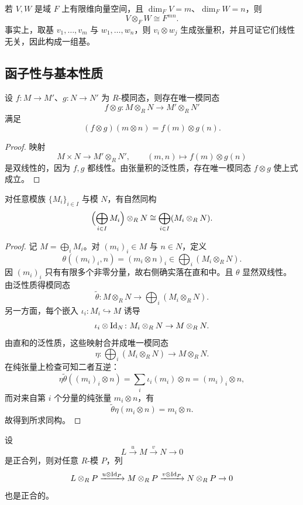 \begin{example}
若 $V,W$ 是域 $F$ 上有限维向量空间，且 $\dim_FV=m$、$\dim_FW=n$，则
\[
V\otimes_F W\cong F^{mn}.
\]
事实上，取基 $v_1,\dots,v_m$ 与 $w_1,\dots,w_n$，则 $v_i\otimes w_j$ 生成张量积，并且可证它们线性无关，因此构成一组基。
\end{example}

\subsection{函子性与基本性质}

\begin{proposition}[函子性]
设 $f\colon M\to M'$、$g\colon N\to N'$ 为 $R$-模同态，则存在唯一模同态
\[
f\otimes g\colon M\otimes_R N\to M'\otimes_R N'
\]
满足
\[
(f\otimes g)(m\otimes n)=f(m)\otimes g(n).
\]
\end{proposition}

\begin{proof}
映射
\[
M\times N\to M'\otimes_R N',
\qquad (m,n)\mapsto f(m)\otimes g(n)
\]
是双线性的，因为 $f,g$ 都线性。由张量积的泛性质，存在唯一模同态 $f\otimes g$ 使上式成立。
\end{proof}

\begin{proposition}
对任意模族 $\{M_i\}_{i\in I}$ 与模 $N$，有自然同构
\[
\Bigl(\bigoplus_{i\in I} M_i\Bigr)\otimes_R N\cong \bigoplus_{i\in I}(M_i\otimes_R N).
\]
\end{proposition}

\begin{proof}
记 $M=\bigoplus_i M_i$。对 $(m_i)_i\in M$ 与 $n\in N$，定义
\[
\theta((m_i)_i,n)=(m_i\otimes n)_i\in \bigoplus_i(M_i\otimes_R N).
\]
因 $(m_i)_i$ 只有有限多个非零分量，故右侧确实落在直和中。且 $\theta$ 显然双线性。由泛性质得模同态
\[
\widetilde\theta\colon M\otimes_R N\to \bigoplus_i(M_i\otimes_R N).
\]
另一方面，每个嵌入 $\iota_i\colon M_i\hookrightarrow M$ 诱导
\[
\iota_i\otimes \mathrm{Id}_N\colon M_i\otimes_R N\to M\otimes_R N.
\]
由直和的泛性质，这些映射合并成唯一模同态
\[
\eta\colon \bigoplus_i(M_i\otimes_R N)\to M\otimes_R N.
\]
在纯张量上检查可知二者互逆：
\[
\eta\widetilde\theta((m_i)_i\otimes n)=\sum_i \iota_i(m_i)\otimes n=(m_i)_i\otimes n,
\]
而对来自第 $i$ 个分量的纯张量 $m_i\otimes n$，有
\[
\widetilde\theta\eta(m_i\otimes n)=m_i\otimes n.
\]
故得到所求同构。
\end{proof}

\begin{theorem}[右正合性]
设
\[
L\xrightarrow{u} M\xrightarrow{v} N\to 0
\]
是正合列，则对任意 $R$-模 $P$，列
\[
L\otimes_R P\xrightarrow{u\otimes \mathrm{Id}_P} M\otimes_R P\xrightarrow{v\otimes \mathrm{Id}_P} N\otimes_R P\to 0
\]
也是正合的。
\end{theorem}

